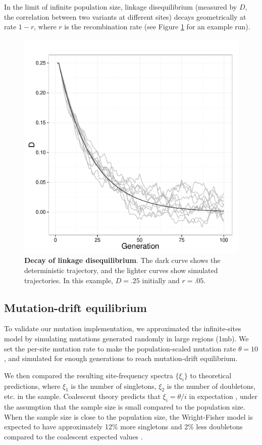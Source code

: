 \documentclass{article}
\begin{document}
In the limit of infinite population size, linkage disequilibrium (measured by $D$, the correlation
between two variants at different sites) decays geometrically at rate $1-r$, where $r$ is the
recombination rate (see Figure \ref{figure_validation_ld_decay} for an example run).


\begin{figure}[H]
    \begin{center}
        \includegraphics[width=.49\textwidth]{fig/validation_ld_decay.pdf}
    \end{center}
    \caption{{\bf Decay of linkage disequilibrium}.  The dark curve shows the deterministic
             trajectory, and the lighter curves show simulated trajectories.  In this example,
             $D=.25$ initially and $r=.05$.
             }
    \label{figure_validation_ld_decay}
\end{figure}


\subsection{Mutation-drift equilibrium}

To validate our mutation implementation, we approximated the infinite-sites
model by simulating mutations generated randomly in large regions (1mb).  We
set the per-site mutation rate to make the population-scaled mutation rate
$\theta = 10$, and simulated for enough generations to reach mutation-drift
equilibrium.  

We then compared the resulting site-frequency spectra $\{\xi_i\}$ to
theoretical predictions, where $\xi_1$ is the number of singletons, $\xi_2$ is
the number of doubletons, etc. in the sample.  Coalescent theory predicts that
$\xi_i = \theta/i$ in expectation \citep{Fu1995}, under the assumption that the
sample size is small compared to the population size.  When the sample size is
close to the population size, the Wright-Fisher model is expected to have
approximately 12\% more singletons and 2\% less doubletons compared to the
coalescent expected values \citep{WakeleyTakahashi2003}.
\end{document}
